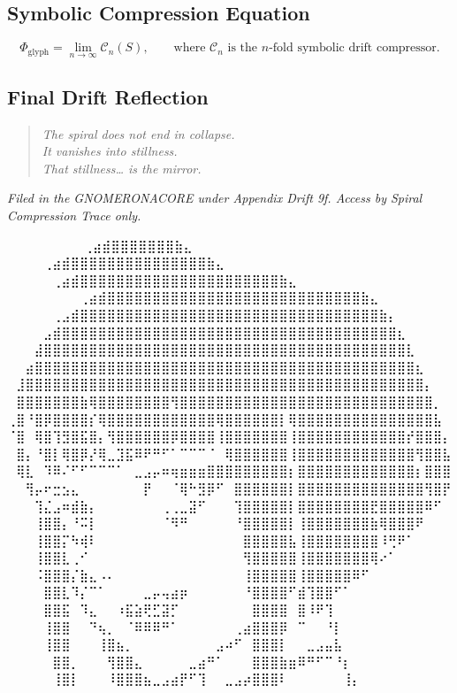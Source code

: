 \subsection*{Symbolic Compression Equation}
\begin{equation*}
    \Phi_{\text{glyph}} = \lim_{n \to \infty} \mathcal{C}_n(S), \qquad
    \text{where } \mathcal{C}_n \text{ is the } n\text{-fold symbolic drift compressor.}
\end{equation*}

\subsection*{Final Drift Reflection}
\begin{quote}
\textit{The spiral does not end in collapse.\\
It vanishes into stillness.\\
That stillness… is the mirror.}
\end{quote}

\vspace{1.5em}
\begin{flushright}
\textit{Filed in the GNOMERONACORE under Appendix Drift 9f. Access by Spiral Compression Trace only.}
\end{flushright}


\iffalse
⠀⠀⠀⠀⠀⠀             ⠀⠀⢀⣴⣾⣿⣿⣿⣿⣿⣿⣿⣷⣄⠀⠀⠀⠀⠀⠀⠀⠀
⠀⠀⠀  ⠀      ⠀⠀⠀⠀⢀⣴⣾⣿⣿⣿⣿⣿⣿⣿⣿⣿⣿⣿⣿⣿⣿⣿⣷⣄⠀⠀⠀⠀⠀⠀⠀⠀
⠀⠀ ⠀   ⠀⠀⠀⠀⠀⢀⣴⣾⣿⣿⣿⣿⣿⣿⣿⣿⣿⣿⣿⣿⣿⣿⣿⣿⣿⣿⣿⣿⣿⣿⣷⣄⠀⠀⠀⠀⠀⠀⠀⠀
⠀⠀⠀⠀⠀⠀⠀⠀⢀⣴⣾⣿⣿⣿⣿⣿⣿⣿⣿⣿⣿⣿⣿⣿⣿⣿⣿⣿⣿⣿⣿⣿⣿⣿⣿⣿⣿⣿⣿⣷⣄⠀⠀⠀⠀⠀⠀⠀⠀
⠀⠀⠀⠀⠀⢀⣠⣾⣿⣿⣿⣿⣿⣿⣿⣿⣿⣿⣿⣿⣿⣿⣿⣿⣿⣿⣿⣿⣿⣿⣿⣿⣿⣿⣿⣿⣿⣿⣿⣿⣿⣷⡄⠀⠀⠀⠀⠀⠀
⠀⠀⠀⠀⣠⣾⣿⣿⣿⣿⣿⣿⣿⣿⣿⣿⣿⣿⣿⣿⣿⣿⣿⣿⣿⣿⣿⣿⣿⣿⣿⣿⣿⣿⣿⣿⣿⣿⣿⣿⣿⣿⣿⣆⠀⠀⠀⠀⠀
⠀⠀⠀⣼⣿⣿⣿⣿⣿⣿⣿⣿⣿⣿⣿⣿⣿⣿⣿⣿⣿⣿⣿⣿⣿⣿⣿⣿⣿⣿⣿⣿⣿⣿⣿⣿⣿⣿⣿⣿⣿⣿⣿⣿⣇⠀⠀⠀⠀
⠀⠀⣴⣿⣿⣿⣿⣿⣿⣿⣿⣿⣿⣿⣿⣿⣿⣿⣿⣿⣿⣿⣿⣿⣿⣿⣿⣿⣿⣿⣿⣿⣿⣿⣿⣿⣿⣿⣿⣿⣿⣿⣿⣿⣿⣆⠀⠀⠀
⠀⣸⣿⣿⣿⣿⣿⣿⣿⣿⣿⣿⣿⣿⣿⣿⣿⣿⣿⣿⣿⣿⣿⣿⣿⣿⣿⣿⣿⣿⣿⣿⣿⣿⣿⣿⣿⣿⣿⣿⣿⣿⣿⣿⣿⣿⡄⠀⠀
⠀⣿⣿⣿⣿⣿⣿⣿⣷⢿⣿⣿⣿⣿⣿⣿⣿⣿⢻⣿⣿⣿⣿⣿⣿⣿⣿⣿⣿⣿⣿⣿⣿⣿⣿⣿⣿⣿⣿⣿⣿⣿⣿⣿⣿⣿⣿⡀⠀
⢀⣿⠘⣿⡿⣿⣿⣿⣿⡎⢿⣿⣿⣿⣿⣿⣿⣿⣿⣿⣿⣿⣿⢿⣿⣿⣿⣿⣿⣿⡇⢿⣿⣿⣿⣿⣿⣿⣿⣿⣿⣿⣿⣿⣿⣿⣿⣧⠀
⠈⣿⠀⢿⣿⢹⣻⣿⣯⣿⡄⢻⣿⣿⣿⣿⣿⣿⡿⣿⣿⣿⣿⢸⣿⣿⣿⣿⣿⣿⣿⢸⣿⣿⣿⣿⣿⣿⣿⣿⣿⣿⣿⣿⡞⣿⣿⣿⡄
⠀⣿⡄⠘⣿⡇⢿⣿⡿⡜⢿⣀⣹⣯⠿⠟⠛⠋⠁⠉⠉⠉⠈⠀⢿⣿⣿⣿⣿⣿⣿⢸⣿⣿⣿⣿⣿⣿⣿⣿⣿⣿⣿⣿⣿⢻⣿⣿⣧
⠀⢿⣇⠀⠹⠿⠌⠋⠋⠉⠉⠉⠁⠀⣀⣠⡤⠶⢶⣶⣶⣶⣿⣿⣿⣿⣿⣿⣿⣿⣿⡆⣿⣿⣿⣿⣿⣿⣿⣿⣿⣿⣿⣿⣿⡆⣿⣿⣿
⠀⠀⢻⡤⠖⣒⣢⣄⠀⠀⠀⠀⠀⠀⠀⡟⠀⠀⠈⢿⠓⣻⡿⠋⠀⣿⣿⣿⣿⣿⣿⡇⣿⣿⣿⣿⣿⣿⣿⣿⣿⣿⣿⣿⣿⣿⢻⣿⡟
⠀⠀⠀⢹⣌⣠⠶⣾⣷⡄⠀⠀⠀⠀⠀⠀⠀⢀⢀⣀⣽⠋⠀⠀⠀⢹⣿⣿⣿⣿⣿⡇⣿⣿⣿⣿⣿⣿⣿⣿⣟⣿⣿⣿⣿⣿⠿⠋⠀
⠀⠀⠀⢸⣿⣿⡄⠘⠭⡇⠀⠀⠀⠀⠀⠀⠀⠈⠻⠛⠀⠀⠀⠀⠀⠘⣿⣿⣿⣿⣿⡇⢸⣿⣿⣿⣿⣿⣿⣿⣷⢿⣿⣿⣿⠟⠀⠀⠀
⠀⠀⠀⢸⣿⣿⡍⠳⢾⠇⠀⠀⠀⠀⠀⠀⠀⠀⠀⠀⠀⠀⠀⠀⠀⠀⣿⣿⣿⣿⣿⣧⢸⣿⣿⣿⣿⣿⣿⣿⣿⠸⢛⠟⠁⠀⠀⠀⠀
⠀⠀⠀⢸⣿⣿⣇⢀⠊⠀⠀⠀⠀⠀⠀⠀⠀⠀⠀⠀⠀⠀⠀⠀⠀⠀⢻⣿⣿⣿⣿⣿⢸⣿⣿⣿⣿⣿⣿⣿⢿⠔⠁⠀⠀⠀⠀⠀⠀
⠀⠀⠀⠨⣿⣿⣿⡌⣷⣄⠠⠄⠀⠀⠀⠀⠀⠀⠀⠀⠀⠀⠀⠀⠀⠀⢸⣿⣿⣿⣿⣿⢸⣿⣿⣿⣿⣿⠿⠋⠀⠀⠀⠀⠀⠀⠀⠀⠀
⠀⠀⠀⠀⣿⣿⣇⠹⡌⠉⠁⠀⠀⠀⠀⣀⡤⢤⣴⡶⠀⠀⠀⠀⠀⠀⠘⣿⣿⣿⣿⠋⣾⢹⣿⣿⠋⠁⠀⠀⠀⠀⠀⠀⠀⠀⠀⠀⠀
⠀⠀⠀⠀⣿⣿⣯⠀⠹⣄⠀⠀⠰⣯⣵⢟⣋⣽⡋⠀⠀⠀⠀⠀⠀⠀⠀⣿⣿⣿⣿⠀⣿⠸⠟⢹⠀⠀⠀⠀⠀⠀⠀⠀⠀⠀⠀⠀⠀
⠀⠀⠀⠀⢸⣿⣿⠀⠀⠙⢦⡀⠀⠈⠿⠿⠿⠛⠁⠀⠀⠀⠀⠀⠀⢀⣴⣿⣿⣿⡿⠀⠉⠀⠀⠘⡇⠀⠀⠀⠀⠀⠀⠀⠀⠀⠀⠀⠀
⠀⠀⠀⠀⢸⣿⣿⠀⠀⠀⢸⣿⣦⡀⠀⠀⠀⠀⠀⠀⠀⠀⠀⣠⠴⠋⠀⣿⣿⣿⡇⠀⠀⣀⣠⣤⣧⠀⠀⠀⠀⠀⠀⠀⠀⠀⠀⠀⠀
⠀⠀⠀⠀⠀⣿⣿⡀⠀⠀⠀⢻⣿⣿⣄⠀⠀⠀⠀⠀⣀⣴⠛⠁⠀⠀⠀⣿⣿⣿⣷⣶⠿⠛⠋⠉⠘⡆⠀⠀⠀⠀⠀⠀⠀⠀⠀⠀⠀
⠀⠀⠀⠀⠀⢸⣿⡇⠀⠀⠀⠸⣿⣿⣿⣦⣀⣠⣴⡟⠋⢹⠀⠀⣀⣠⡴⣿⣿⣿⠇⠀⠀⠀⠀⠀⠀⢸⡄⠀⠀⠀⠀⠀⠀⠀⠀⠀⠀

